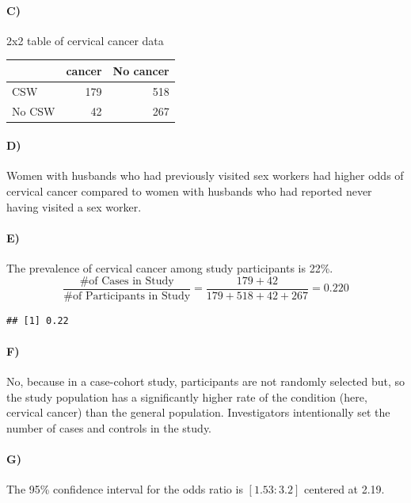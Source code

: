 \documentclass[
]{article}
\begin{document}
\paragraph{C)}\label{c-1}

2x2 table of cervical cancer data

\begin{longtable}[]{@{}lrr@{}}
\toprule\noalign{}
& cancer & No cancer \\
\midrule\noalign{}
\endhead
\bottomrule\noalign{}
\endlastfoot
CSW & 179 & 518 \\
No CSW & 42 & 267 \\
\end{longtable}

\paragraph{D)}\label{d-1}

Women with husbands who had previously visited sex workers had higher
odds of cervical cancer compared to women with husbands who had reported
never having visited a sex worker.

\paragraph{E)}\label{e}

The prevalence of cervical cancer among study participants is 22\%.
\[\frac{\text{\# of Cases in Study}} {\text{\# of Participants in Study}} = \frac{179+42}{179 + 518 + 42 + 267} = 0.220\]

\begin{verbatim}
## [1] 0.22
\end{verbatim}

\paragraph{F)}\label{f}

No, because in a case-cohort study, participants are not randomly
selected but, so the study population has a significantly higher rate of
the condition (here, cervical cancer) than the general population.
Investigators intentionally set the number of cases and controls in the
study.

\paragraph{G)}\label{g}

The 95\% confidence interval for the odds ratio is \([1.53 : 3.2]\)
centered at 2.19.
\end{document}
